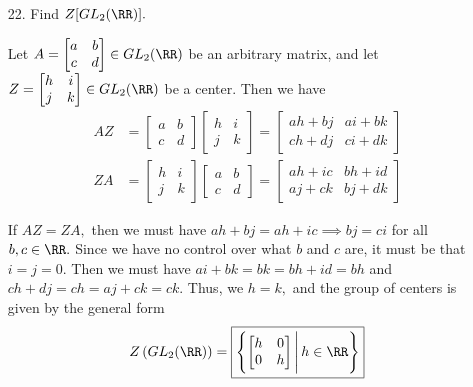 \documentclass{article}
\begin{document}
\begin{itemize}
	\item[22.] Find $Z[GL_2(\RR)].$
		\begin{soln}
			Let $A=\begin{bmatrix}
				a & b \\ c & d
			\end{bmatrix}\in GL_2(\RR)$ be an arbitrary matrix, and let $Z=\begin{bmatrix}
				h & i \\ j & k
			\end{bmatrix}\in GL_2(\RR)$ be a center. Then we have
			\begin{align*}
				AZ &= \begin{bmatrix}
					a & b \\ c & d
				\end{bmatrix} \begin{bmatrix}
					h & i \\ j & k
				\end{bmatrix} = \begin{bmatrix}
					ah+bj & ai+bk \\ ch+dj & ci+dk
				\end{bmatrix} \\
				ZA &= \begin{bmatrix}
					h & i \\ j & k
				\end{bmatrix}\begin{bmatrix}
					a & b \\ c & d
				\end{bmatrix} = \begin{bmatrix}
					ah+ic & bh+id \\ aj+ck & bj+dk
				\end{bmatrix}
			\end{align*}

			If $AZ=ZA,$ then we must have $ah+bj=ah+ic\implies bj=ci$ for all $b, c\in\RR.$ Since we have no control over what $b$ and $c$ are, it must be that $i=j=0.$ Then we must have $ai+bk=bk=bh+id=bh$ and $ch+dj=ch=aj+ck=ck.$ Thus, we $h=k,$ and the group of centers is given by the general form
			\[ Z\left( GL_2(\RR) \right)=\boxed{ \left\{ \begin{bmatrix}
				h & 0 \\ 0 & h
		\end{bmatrix}\Bigg\vert\, h\in\RR\right\}}\]
		\end{soln}
		
\end{itemize}
\end{document}

